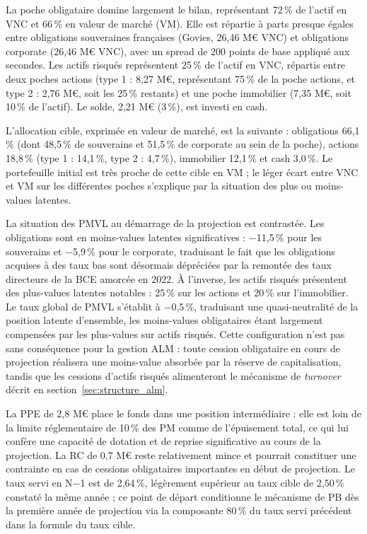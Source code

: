La poche obligataire domine largement le bilan, représentant 72\,\% de l'actif en VNC et 66\,\% en valeur de marché (VM). Elle est répartie à parts presque égales entre obligations souveraines françaises (Govies, 26,46 M€ VNC) et obligations corporate (26,46 M€ VNC), avec un spread de 200 points de base appliqué aux secondes. Les actifs risqués représentent 25\,\% de l'actif en VNC, répartis entre deux poches actions (type 1 : 8,27 M€, représentant 75\,\% de la poche actions, et type 2 : 2,76 M€, soit les 25\,\% restants) et une poche immobilier (7,35 M€, soit 10\,\% de l'actif). Le solde, 2,21 M€ (3\,\%), est investi en cash.

L'allocation cible, exprimée en valeur de marché, est la suivante : obligations 66,1\,\% (dont 48,5\,\% de souverains et 51,5\,\% de corporate au sein de la poche), actions 18,8\,\% (type 1 : 14,1\,\%, type 2 : 4,7\,\%), immobilier 12,1\,\% et cash 3,0\,\%. Le portefeuille initial est très proche de cette cible en VM ; le léger écart entre VNC et VM sur les différentes poches s'explique par la situation des plus ou moins-values latentes.


La situation des PMVL au démarrage de la projection est contrastée. Les obligations sont en moins-values latentes significatives : $-$11,5\,\% pour les souverains et $-$5,9\,\% pour le corporate, traduisant le fait que les obligations acquises à des taux bas sont désormais dépréciées par la remontée des taux directeurs de la BCE amorcée en 2022. À l'inverse, les actifs risqués présentent des plus-values latentes notables : 25\,\% sur les actions et 20\,\% sur l'immobilier. Le taux global de PMVL s'établit à $-$0,5\,\%, traduisant une quasi-neutralité de la position latente d'ensemble, les moins-values obligataires étant largement compensées par les plus-values sur actifs risqués. Cette configuration n'est pas sans conséquence pour la gestion ALM : toute cession obligataire en cours de projection réalisera une moins-value absorbée par la réserve de capitalisation, tandis que les cessions d'actifs risqués alimenteront le mécanisme de \textit{turnover} décrit en section~\ref{sec:structure_alm}.

La PPE de 2,8 M€ place le fonds dans une position intermédiaire : elle est loin de la limite réglementaire de 10\,\% des PM comme de l'épuisement total, ce qui lui confère une capacité de dotation et de reprise significative au cours de la projection. La RC de 0,7 M€ reste relativement mince et pourrait constituer une contrainte en cas de cessions obligataires importantes en début de projection. Le taux servi en N$-$1 est de 2,64\,\%, légèrement supérieur au taux cible de 2,50\,\% constaté la même année ; ce point de départ conditionne le mécanisme de PB dès la première année de projection via la composante 80\,\% du taux servi précédent dans la formule du taux cible.

